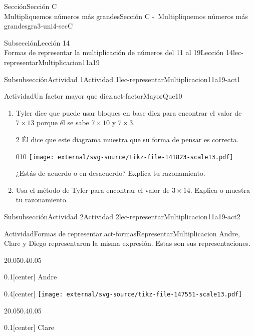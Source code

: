 \begin{sectionptx}{Sección}{{\Large Sección C\\}Multipliquemos números más grandes}{}{Sección C -~Multipliquemos números más grandes}{}{}{gra3-uni4-secC}
\begin{subsectionptx}{Subsección}{{\normalsize Lección 14\\[-0.05cm]}Formas de representar la multiplicación de números del 11 al 19}{}{Lección 14}{}{}{lec-representarMultiplicacion11a19}
\typeout{************************************************}
%
\begin{subsubsectionptx}{Subsubsección}{Actividad 1}{}{Actividad 1}{}{}{lec-representarMultiplicacion11a19-act1}
\begin{activity}{Actividad}{Un factor mayor que diez.}{act-factorMayorQue10}%
%
\begin{enumerate}
\item{}
Tyler dice que puede usar bloques en base diez para encontrar el valor de \(7\times 13\) porque él se sabe \(7\times 10\) y \(7\times 3\). 
\begin{multicols}{2}
Él dice que este diagrama muestra que su forma de pensar es correcta.%
\begin{image}{0}{1}{0}{}%
\texttt{[image: external/svg-source/tikz-file-141823-scale13.pdf]}
\end{image}%
\end{multicols}
¿Estás de acuerdo o en desacuerdo? Explica tu razonamiento.%
\item{}Usa el método de Tyler para encontrar el valor de  \(3\times 14\). Explica o muestra tu razonamiento.%
\end{enumerate}
\end{activity}%
\end{subsubsectionptx}
%
%
\typeout{************************************************}
\typeout{************************************************}
%
\clearpage
\begin{subsubsectionptx}{Subsubsección}{Actividad 2}{}{Actividad 2}{}{}{lec-representarMultiplicacion11a19-act2}
\begin{activity}{Actividad}{Formas de representar.}{act-formasRepresentarMultiplicacion}%
Andre, Clare y Diego representaron la misma expresión. Estas son sus representaciones.%
\begin{sidebyside}{2}{0.05}{0.4}{0.05}%
\begin{sbspanel}{0.1}[center]%
Andre%
\end{sbspanel}%
\begin{sbspanel}{0.4}[center]%
\texttt{[image: external/svg-source/tikz-file-147551-scale13.pdf]}
\end{sbspanel}%
\end{sidebyside}%
\begin{sidebyside}{2}{0.05}{0.4}{0.05}%
\begin{sbspanel}{0.1}[center]%
Clare%
\end{sbspanel}%

\end{sidebyside}
\end{activity}
\end{subsubsectionptx}
\end{subsectionptx}
\end{sectionptx}
